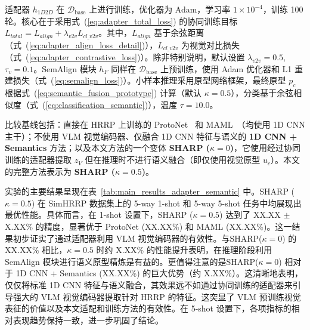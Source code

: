  适配器 $h_{1D2D}$ 在 $\mathcal{D}_{\text{base}}$ 上进行训练，优化器为 Adam，学习率 $1 \times 10^{-4}$，训练 100 轮。核心在于采用式~(\ref{eq:adapter_total_loss}) 的协同训练目标 $L_{total} = L_{align} + \lambda_{v2v} L_{cl\_v2v}$。其中，$L_{align}$ 基于余弦距离（式~(\ref{eq:adapter_align_loss_detail})），$L_{cl\_v2v}$ 为视觉对比损失（式~(\ref{eq:adapter_contrastive_loss})）。除非特别说明，默认设置 $\lambda_{v2v}=0.5$, $\tau_v=0.1$。SemAlign 模块 $h_F$ 同样在 $\mathcal{D}_{\text{base}}$ 上预训练，使用 Adam 优化器和 L1 重建损失（式~(\ref{eq:semalign_loss})）。小样本推理采用原型网络框架，最终原型 $p_c$ 根据式~(\ref{eq:semantic_fusion_prototype}) 计算（默认 $\kappa=0.5$），分类基于余弦相似度（式~(\ref{eq:classification_semantic})），温度 $\tau=10.0$。 
 
 比较基线包括：直接在 HRRP 上训练的 ProtoNet~\cite{tian_open_2022} 和 MAML~\cite{Finn2017MAML}（均使用 1D CNN 主干）；不使用 VLM 视觉编码器、仅融合 1D CNN 特征与语义的 \textbf{1D CNN + Semantics} 方法；以及本文方法的一个变体 \textbf{SHARP ($\kappa=0$)}，它使用经过协同训练的适配器提取 $z_V$ 但在推理时不进行语义融合（即仅使用视觉原型 $u_c$）。本文的完整方法表示为 \textbf{SHARP ($\kappa=0.5$)}。 
 
 实验的主要结果呈现在表~\ref{tab:main_results_adapter_semantic} 中。SHARP ($\kappa=0.5$) 在 SimHRRP 数据集上的 5-way 1-shot 和 5-way 5-shot 任务中均展现出最优性能。具体而言，在 1-shot 设置下，SHARP ($\kappa=0.5$) 达到了 XX.XX $\pm$ X.XX\% 的精度，显著优于 ProtoNet (XX.XX\%) 和 MAML (XX.XX\%)。这一结果初步证实了通过适配器利用 VLM 视觉编码器的有效性。与SHARP($\kappa=0$) 的 XX.XX\% 相比，$\kappa=0.5$ 时约 X.XX\% 的性能提升表明，在推理阶段利用 SemAlign 模块进行语义原型精炼是有益的。更值得注意的是SHARP($\kappa=0$) 相对于 1D CNN + Semantics (XX.XX\%) 的巨大优势（约 X.XX\%）。这清晰地表明，仅仅将标准 1D CNN 特征与语义融合，其效果远不如通过协同训练的适配器来引导强大的 VLM 视觉编码器提取针对 HRRP 的特征。这突显了 VLM 预训练视觉表征的价值以及本文适配和训练方法的有效性。在 5-shot 设置下，各项指标的相对表现趋势保持一致，进一步巩固了结论。 
 
